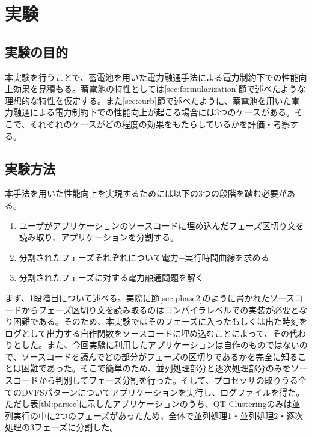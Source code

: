 \chapter{実験}
\label{chap:experiment}


\section{実験の目的}
\label{sec:purpose}

本実験を行うことで、蓄電池を用いた電力融通手法による電力制約下での性能向上効果を見積もる。蓄電池の特性としては\ref{sec:formularization}節で述べたような理想的な特性を仮定する。また\ref{sec:curb}節で述べたように、蓄電池を用いた電力融通による電力制約下での性能向上が起こる場合には3つのケースがある。そこで、それぞれのケースがどの程度の効果をもたらしているかを評価・考察する。



\section{実験方法}
\label{sec:method}

本手法を用いた性能向上を実現するためには以下の3つの段階を踏む必要がある。

\begin{enumerate}
\item ユーザがアプリケーションのソースコードに埋め込んだフェーズ区切り文を読み取り、アプリケーションを分割する。
\item 分割されたフェーズそれぞれについて電力−実行時間曲線を求める
\item 分割されたフェーズに対する電力融通問題を解く
\end{enumerate}

まず、1段階目について述べる。実際に節\ref{sec:phase2}のように書かれたソースコードからフェーズ区切り文を読み取るのはコンパイラレベルでの実装が必要となり困難である。そのため、本実験ではそのフェーズに入ったもしくは出た時刻をログとして出力する自作関数をソースコードに埋め込むことによって、その代わりとした。また、今回実験に利用したアプリケーションは自作のものではないので、ソースコードを読んでどの部分がフェーズの区切りであるかを完全に知ることは困難であった。そこで簡単のため、並列処理部分と逐次処理部分のみをソースコードから判別してフェーズ分割を行った。そして、プロセッサの取りうる全てのDVFSパターンについてアプリケーションを実行し、ログファイルを得た。ただし表\ref{tbl:parsec}に示したアプリケーションのうち、QT Clusteringのみは並列実行の中に2つのフェーズがあったため、全体で並列処理1・並列処理2・逐次処理の3フェーズに分割した。

